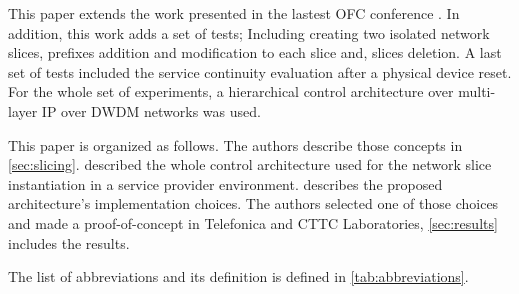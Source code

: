 \documentclass[journal,article,submit,moreauthors,pdftex]{Definitions/mdpi}
\begin{document}
This paper extends the work presented in the lastest OFC conference \cite{OFC2021alcala}. In addition, this work adds a set of tests; Including creating two isolated network slices, prefixes addition and modification to each slice and, slices deletion. A last set of tests included the service continuity evaluation after a physical device reset. For the whole set of experiments, a hierarchical control architecture over multi-layer IP over DWDM networks was used. 


This paper is organized as follows. The authors describe those concepts in \cref{sec:slicing}.  described the whole control architecture used for the network slice instantiation in a service provider environment.  describes the proposed architecture's implementation choices. The authors selected one of those choices and made a proof-of-concept in Telefonica and CTTC Laboratories, \cref{sec:results} includes the results.

The list of abbreviations and its definition is defined in \cref{tab:abbreviations}.
\end{document}
